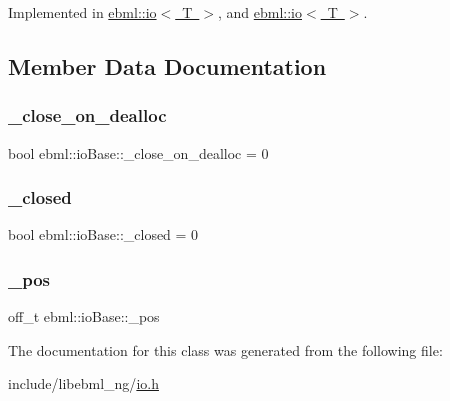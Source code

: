 Implemented in \mbox{\hyperlink{classebml_1_1io_a5c3f2df6edfbd090b4d0fbc8a6dacccb}{ebml\+::io$<$ T $>$}}, and \mbox{\hyperlink{classebml_1_1io_aedbdf5a69ee0ae64f909a59645cd0db7}{ebml\+::io$<$ T $>$}}.



\subsection{Member Data Documentation}
\mbox{\label{classebml_1_1ioBase_a0083c31349d480a5e3b83dd366c22144}} 
\subsubsection{\texorpdfstring{\+\_\+close\+\_\+on\+\_\+dealloc}{\_close\_on\_dealloc}}
{\footnotesize\ttfamily bool ebml\+::io\+Base\+::\+\_\+close\+\_\+on\+\_\+dealloc = 0\hspace{0.3cm}{\ttfamily [protected]}}

\mbox{\label{classebml_1_1ioBase_ab87e105b03270d59019c05e7451b51d3}} 
\subsubsection{\texorpdfstring{\+\_\+closed}{\_closed}}
{\footnotesize\ttfamily bool ebml\+::io\+Base\+::\+\_\+closed = 0\hspace{0.3cm}{\ttfamily [protected]}}

\mbox{\label{classebml_1_1ioBase_ada889242b80f658e0a80a465bf2bd9f7}} 
\subsubsection{\texorpdfstring{\+\_\+pos}{\_pos}}
{\footnotesize\ttfamily off\+\_\+t ebml\+::io\+Base\+::\+\_\+pos\hspace{0.3cm}{\ttfamily [protected]}}



The documentation for this class was generated from the following file\+:\begin{DoxyCompactItemize}
\item 
include/libebml\+\_\+ng/\mbox{\hyperlink{io_8h}{io.\+h}}\end{DoxyCompactItemize}

